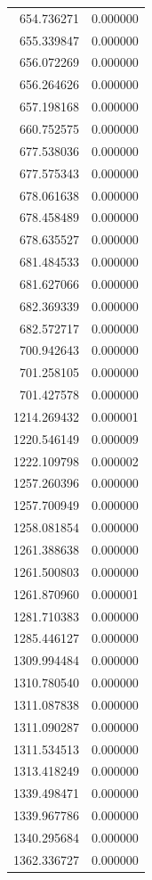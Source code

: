 \begin{longtable}{rr}
654.736271 & 0.000000 \\
655.339847 & 0.000000 \\
656.072269 & 0.000000 \\
656.264626 & 0.000000 \\
657.198168 & 0.000000 \\
660.752575 & 0.000000 \\
677.538036 & 0.000000 \\
677.575343 & 0.000000 \\
678.061638 & 0.000000 \\
678.458489 & 0.000000 \\
678.635527 & 0.000000 \\
681.484533 & 0.000000 \\
681.627066 & 0.000000 \\
682.369339 & 0.000000 \\
682.572717 & 0.000000 \\
700.942643 & 0.000000 \\
701.258105 & 0.000000 \\
701.427578 & 0.000000 \\
1214.269432 & 0.000001 \\
1220.546149 & 0.000009 \\
1222.109798 & 0.000002 \\
1257.260396 & 0.000000 \\
1257.700949 & 0.000000 \\
1258.081854 & 0.000000 \\
1261.388638 & 0.000000 \\
1261.500803 & 0.000000 \\
1261.870960 & 0.000001 \\
1281.710383 & 0.000000 \\
1285.446127 & 0.000000 \\
1309.994484 & 0.000000 \\
1310.780540 & 0.000000 \\
1311.087838 & 0.000000 \\
1311.090287 & 0.000000 \\
1311.534513 & 0.000000 \\
1313.418249 & 0.000000 \\
1339.498471 & 0.000000 \\
1339.967786 & 0.000000 \\
1340.295684 & 0.000000 \\
1362.336727 & 0.000000 \\
\end{longtable}
